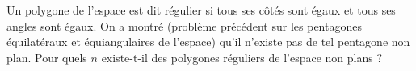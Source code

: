 Un polygone de l'espace est dit régulier si tous ses côtés sont égaux et tous ses angles sont égaux. On a montré (problème précédent sur les pentagones équilatéraux et équiangulaires de l'espace) qu'il n'existe pas de tel pentagone non plan. Pour quels $n$ existe-t-il des polygones réguliers de l'espace non plans ?
